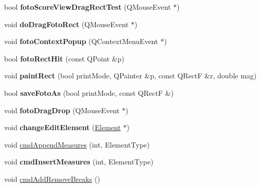 \begin{DoxyCompactItemize}
bool {\bfseries foto\+Score\+View\+Drag\+Rect\+Test} (Q\+Mouse\+Event $\ast$)
\item 
\mbox{\label{class_ms_1_1_score_view_a40461f9beb8ff0c833691b9cc165f961}} 
void {\bfseries do\+Drag\+Foto\+Rect} (Q\+Mouse\+Event $\ast$)
\item 
\mbox{\label{class_ms_1_1_score_view_ad169a5fe48dd404fb8a57685fe2092d0}} 
void {\bfseries foto\+Context\+Popup} (Q\+Context\+Menu\+Event $\ast$)
\item 
\mbox{\label{class_ms_1_1_score_view_a8e2ad1b126b4cbe0bc6f6a51ba1686e6}} 
bool {\bfseries foto\+Rect\+Hit} (const Q\+Point \&p)
\item 
\mbox{\label{class_ms_1_1_score_view_a754837351301fa3b69f457dd4ceb64eb}} 
void {\bfseries paint\+Rect} (bool print\+Mode, Q\+Painter \&p, const Q\+RectF \&r, double mag)
\item 
\mbox{\label{class_ms_1_1_score_view_a338b92ef00f7795697ef4969b68eaa33}} 
bool {\bfseries save\+Foto\+As} (bool print\+Mode, const Q\+RectF \&)
\item 
\mbox{\label{class_ms_1_1_score_view_a34b5c62fdb317c11cacc8c6f0aef70ad}} 
void {\bfseries foto\+Drag\+Drop} (Q\+Mouse\+Event $\ast$)
\item 
\mbox{\label{class_ms_1_1_score_view_a9ab989307fe6147eb549078026f8653e}} 
void {\bfseries change\+Edit\+Element} (\hyperlink{class_ms_1_1_element}{Element} $\ast$)
\item 
void \hyperlink{class_ms_1_1_score_view_a336033b7ff252caa99dca592b20805de}{cmd\+Append\+Measures} (int, Element\+Type)
\item 
\mbox{\label{class_ms_1_1_score_view_aab9661da3b01fe82845f0a1c839bede9}} 
void {\bfseries cmd\+Insert\+Measures} (int, Element\+Type)
\item 
void \hyperlink{class_ms_1_1_score_view_a1dc0206a240c5b5e4b014fead61e8d6c}{cmd\+Add\+Remove\+Breaks} ()
\item 
\mbox{\label{class_ms_1_1_score_view_a89d82d8e3e9eebf0ec8d360053df5633}} 

\end{DoxyCompactItemize}
